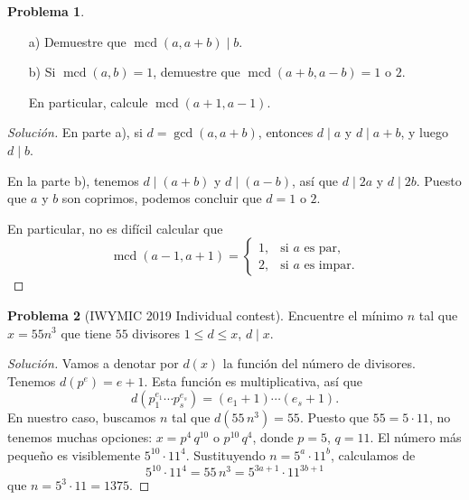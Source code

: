 \documentclass{article}
\DeclareMathOperator{\mcd}{mcd}
\theoremstyle{definition}
\newtheorem{problema}{Problema}
\newenvironment{solucion}{\begin{proof}[Solución]}{\end{proof}}
\begin{document}
\begin{problema}
  ~

  \begin{enumerate}
  \item[a)] Demuestre que $\mcd(a, a + b) \mid b$.

  \item[b)] Si $\mcd (a,b) = 1$, demuestre que $\mcd (a+b, a-b) = 1$ o $2$.

    En particular, calcule $\mcd (a+1, a-1)$.
  \end{enumerate}

  \ifdefined\solutions\begin{solucion}
    En parte a), si $d = \gcd (a,a+b)$, entonces $d \mid a$ y $d \mid a+b$, y
    luego $d \mid b$.

    \vspace{1em}

    En la parte b), tenemos $d \mid (a+b)$ y $d \mid (a-b)$, así que $d \mid 2a$
    y $d \mid 2b$. Puesto que $a$ y $b$ son coprimos, podemos concluir que
    $d = 1$ o $2$.

    En particular, no es difícil calcular que
    \[ \mcd (a-1,a+1) =
      \begin{cases}
        1, & \text{si }a\text{ es par}, \\
        2, & \text{si }a\text{ es impar}.
      \end{cases} \]
    \end{solucion}\fi
\end{problema}

\begin{problema}[IWYMIC 2019 Individual contest]
  Encuentre el mínimo $n$ tal que $x = 55 n^3$ que tiene $55$ divisores
  $1 \le d \le x$, $d \mid x$.

  \ifdefined\solutions\begin{solucion}
    Vamos a denotar por $d (x)$ la función del número de divisores. Tenemos
    $d (p^e) = e+1$. Esta función es multiplicativa, así que
    $$d (p_1^{e_1}\cdots p_s^{e_s}) = (e_1+1)\cdots (e_s+1).$$
    En nuestro caso, buscamos $n$ tal que $d (55\,n^3) = 55$. Puesto que
    $55 = 5\cdot 11$, no tenemos muchas opciones:
    $x = p^4\,q^{10}$ o $p^{10}\,q^4$, donde $p = 5$, $q = 11$.
    El número más pequeño es visiblemente $5^{10}\cdot 11^4$. Sustituyendo
    $n = 5^a\cdot 11^b$, calculamos de
    $$5^{10}\cdot 11^4 = 55\,n^3 = 5^{3a+1}\cdot 11^{3b+1}$$
    que $n = 5^3\cdot 11 = 1375$.
  \end{solucion}\fi
\end{problema}
\end{document}
